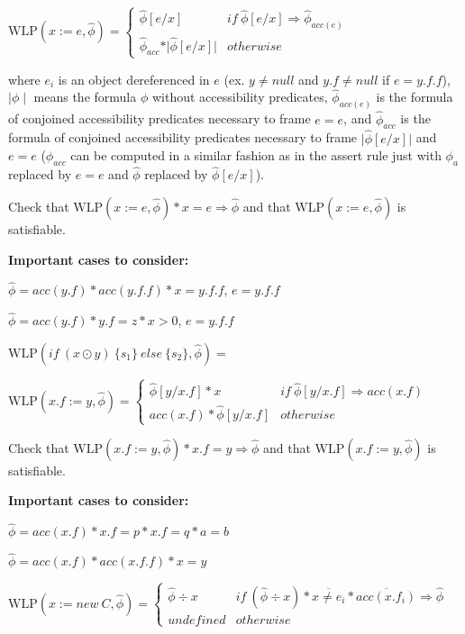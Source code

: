 \documentclass {article}
\newcommand{\eif}[3]{if \ ( #1 ) \ \{ #2 \} \ else \ \{#3\}}
\newcommand{\fphi}{\widehat{\phi}}
\newcommand{\imp}{\Rightarrow}
\newcommand{\wlp}[2]{\text{WLP}(#1,#2)}
\begin{document}
$\wlp{x := e}{\fphi} = 
	\begin{cases}
	 \fphi[e/x] & if \ \fphi[e/x] \imp \fphi_{acc(e)} \\
	 \fphi_{acc} \ast \vert \fphi[e/x] \vert & otherwise
	\end{cases} $
	
where $e_i$ is an object dereferenced in $e$ (ex. $y \neq null$ and $y.f \neq null$ if $e = y.f.f$), $\mid \phi \mid$ means the formula $\phi$ without accessibility predicates, $\fphi_{acc(e)}$ is the formula of conjoined accessibility predicates necessary to frame $e = e$, and $\fphi_{acc}$ is the formula of conjoined accessibility predicates necessary to frame $\vert \fphi[e/x] \vert$ and $e = e$ ($\fphi_{acc}$ can be computed in a similar fashion as in the assert rule just with $\phi_a$ replaced by $e = e$ and $\fphi$ replaced by $\fphi[e/x]$).

Check that $\wlp{x := e}{\fphi} \ast x = e \imp \fphi$ and that $\wlp{x := e}{\fphi}$ is satisfiable.

\textbf{Important cases to consider:}

$\fphi = acc(y.f) \ast acc(y.f.f) \ast x = y.f.f$, $e=y.f.f$

$\fphi = acc(y.f) \ast y.f = z \ast x > 0$, $e=y.f.f$

\vspace{0.5cm}

$\wlp{\eif{x \odot y}{s_1}{s_2}}{\fphi} = $

\vspace{0.5cm}

$\wlp{x.f := y}{\fphi} =  
	\begin{cases}
	 \fphi[y/x.f] \ast x & if \ \fphi[y/x.f] \imp acc(x.f) \\
	 acc(x.f) \ast \fphi[y/x.f] & otherwise
	\end{cases}$

Check that $\wlp{x.f := y}{\fphi} \ast x.f = y \imp \fphi$ and that $\wlp{x.f := y}{\fphi}$ is satisfiable.

\textbf{Important cases to consider:}

$\fphi = acc(x.f) \ast x.f = p \ast x.f = q \ast a = b $

$\fphi = acc(x.f) \ast acc(x.f.f) \ast x = y $

\vspace{0.5cm}

$\wlp{x := new\ C}{\fphi} = 
	\begin{cases}
	 \fphi \div x & if \ (\fphi \div x) \ast \overline{x \neq e_i} \ast \overline{acc(x.f_i)} \imp \fphi \\
	 undefined & otherwise
	\end{cases}$ 
\end{document}
